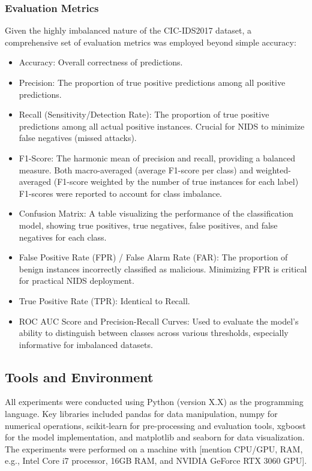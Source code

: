 \subsubsection{Evaluation Metrics}
Given the highly imbalanced nature of the CIC-IDS2017 dataset, a comprehensive set of evaluation metrics was employed beyond simple accuracy:
\begin{itemize}
    \item Accuracy: Overall correctness of predictions.
    \item Precision: The proportion of true positive predictions among all positive predictions.
    \item  Recall (Sensitivity/Detection Rate): The proportion of true positive predictions among all actual positive instances. Crucial for NIDS to minimize false negatives (missed attacks).
    \item F1-Score: The harmonic mean of precision and recall, providing a balanced measure. Both macro-averaged (average F1-score per class) and weighted-averaged (F1-score weighted by the number of true instances for each label) F1-scores were reported to account for class imbalance.
    \item Confusion Matrix: A table visualizing the performance of the classification model, showing true positives, true negatives, false positives, and false negatives for each class.
    \item False Positive Rate (FPR) / False Alarm Rate (FAR): The proportion of benign instances incorrectly classified as malicious. Minimizing FPR is critical for practical NIDS deployment.
    \item True Positive Rate (TPR): Identical to Recall.
     \item ROC AUC Score and Precision-Recall Curves: Used to evaluate the model's ability to distinguish between classes across various thresholds, especially informative for imbalanced datasets.
\end{itemize}
          
\subsection{Tools and Environment}
All experiments were conducted using Python (version X.X) as the programming language. Key libraries included pandas for data manipulation, numpy for numerical operations, scikit-learn for pre-processing and evaluation tools, xgboost for the model implementation, and matplotlib and seaborn for data visualization. The experiments were performed on a machine with [mention CPU/GPU, RAM, e.g., Intel Core i7 processor, 16GB RAM, and NVIDIA GeForce RTX 3060 GPU].

